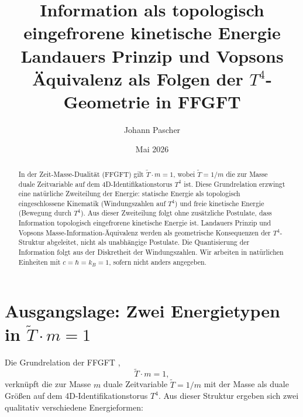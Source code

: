 
\title{Information als topologisch eingefrorene kinetische Energie\\[0.4em]
\large Landauers Prinzip und Vopsons Äquivalenz als Folgen der \(T^4\)-Geometrie in FFGFT}
\author{Johann Pascher}
\date{Mai 2026}
\maketitle

\begin{abstract}
In der Zeit-Masse-Dualität (FFGFT) gilt \(\tilde{T} \cdot m = 1\),
wobei \(\tilde{T} = 1/m\) die zur Masse duale Zeitvariable auf dem
4D-Identifikationstorus \(T^4\) ist.
Diese Grundrelation erzwingt eine natürliche Zweiteilung der Energie:
statische Energie als topologisch eingeschlossene Kinematik
(Windungszahlen auf \(T^4\)) und freie kinetische Energie
(Bewegung durch \(T^4\)).
Aus dieser Zweiteilung folgt ohne zusätzliche Postulate,
dass Information topologisch eingefrorene kinetische Energie ist.
Landauers Prinzip \cite{Landauer1961} und Vopsons
Masse-Information-Äquivalenz \cite{Vopson2019}
werden als geometrische Konsequenzen der \(T^4\)-Struktur abgeleitet,
nicht als unabhängige Postulate.
Die Quantisierung der Information folgt aus der Diskretheit der Windungszahlen.
Wir arbeiten in natürlichen Einheiten mit \(c = \hbar = k_B = 1\),
sofern nicht anders angegeben.
\end{abstract}

\tableofcontents
\newpage

\section{Ausgangslage: Zwei Energietypen in \(\tilde{T} \cdot m = 1\)}

Die Grundrelation der FFGFT \cite{Pascher2026},
\begin{equation}
  \tilde{T} \cdot m = 1,
\end{equation}
verknüpft die zur Masse \(m\) duale Zeitvariable
\(\tilde{T} = 1/m\) mit der Masse als duale Größen auf dem
4D-Identifikationstorus \(T^4\).
Aus dieser Struktur ergeben sich zwei qualitativ verschiedene
Energieformen:

